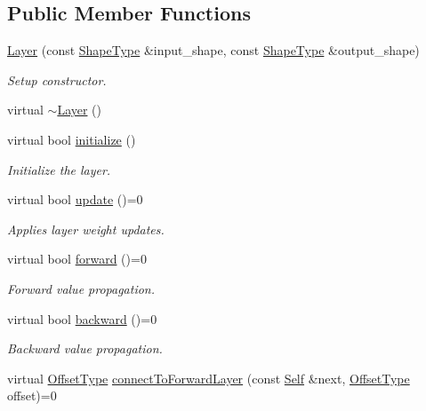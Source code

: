 \subsection*{Public Member Functions}
\begin{DoxyCompactItemize}
\item 
\hyperlink{classffnn_1_1layer_1_1_layer_a0c766a6f5770ea0ae8a7e660523eb413}{Layer} (const \hyperlink{classffnn_1_1layer_1_1_layer_ab80478345a2579402ae086a2f7de1ca2}{Shape\-Type} \&input\-\_\-shape, const \hyperlink{classffnn_1_1layer_1_1_layer_ab80478345a2579402ae086a2f7de1ca2}{Shape\-Type} \&output\-\_\-shape)
\begin{DoxyCompactList}\small\item\em Setup constructor. \end{DoxyCompactList}\item 
virtual \hyperlink{classffnn_1_1layer_1_1_layer_aa466bcb2ac40d059e9b6e40be157d1b4}{$\sim$\-Layer} ()
\item 
virtual bool \hyperlink{classffnn_1_1layer_1_1_layer_ae8a7daa81382a7965b8ab8861da7e522}{initialize} ()
\begin{DoxyCompactList}\small\item\em Initialize the layer. \end{DoxyCompactList}\item 
virtual bool \hyperlink{classffnn_1_1layer_1_1_layer_af1bce67477e4890a86aeb96ed1c781d6}{update} ()=0
\begin{DoxyCompactList}\small\item\em Applies layer weight updates. \end{DoxyCompactList}\item 
virtual bool \hyperlink{classffnn_1_1layer_1_1_layer_aa47aae451c4a9ee4daef90b60ac291a1}{forward} ()=0
\begin{DoxyCompactList}\small\item\em Forward value propagation. \end{DoxyCompactList}\item 
virtual bool \hyperlink{classffnn_1_1layer_1_1_layer_ac0762afdbcb7e41fb3197dec5ae67858}{backward} ()=0
\begin{DoxyCompactList}\small\item\em Backward value propagation. \end{DoxyCompactList}\item 
virtual \hyperlink{classffnn_1_1layer_1_1_layer_a2130560f43788898079b7c5c01fb94c8}{Offset\-Type} \hyperlink{classffnn_1_1layer_1_1_layer_a42b960e503830c5ab13905f3e7faa939}{connect\-To\-Forward\-Layer} (const \hyperlink{classffnn_1_1layer_1_1_layer_a1d461b24632a849b2c26a5051a9cdbeb}{Self} \&next, \hyperlink{classffnn_1_1layer_1_1_layer_a2130560f43788898079b7c5c01fb94c8}{Offset\-Type} offset)=0

\end{DoxyCompactItemize}
